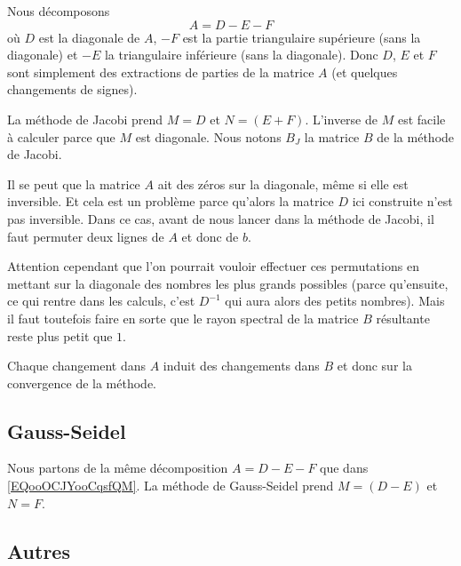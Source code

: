 Nous décomposons
\begin{equation}        \label{EQooOCJYooCqsfQM}
	A=D-E-F
\end{equation}
où \( D\) est la diagonale de \( A\), \( -F\) est la partie triangulaire supérieure (sans la diagonale) et \( -E\) la triangulaire inférieure (sans la diagonale). Donc \( D\), \( E\) et \( F\) sont simplement des extractions de parties de la matrice \( A\) (et quelques changements de signes).

La méthode de Jacobi prend \( M=D\) et \( N=(E+F)\). L'inverse de \( M\) est facile à calculer parce que \( M\) est diagonale. Nous notons \( B_J\) la matrice \( B\) de la méthode de Jacobi.

\begin{remark}
	Il se peut que la matrice \( A\) ait des zéros sur la diagonale, même si elle est inversible. Et cela est un problème parce qu'alors la matrice \( D\) ici construite n'est pas inversible. Dans ce cas, avant de nous lancer dans la méthode de Jacobi, il faut permuter deux lignes de \( A\) et donc de \( b\).

	Attention cependant que l'on pourrait vouloir effectuer ces permutations en mettant sur la diagonale des nombres les plus grands possibles (parce qu'ensuite, ce qui rentre dans les calculs, c'est \( D^{-1}\) qui aura alors des petits nombres). Mais il faut toutefois faire en sorte que le rayon spectral de la matrice \(B \) résultante reste plus petit que \( 1\).

	Chaque changement dans \( A\) induit des changements dans \( B\) et donc sur la convergence de la méthode.
\end{remark}

\subsection{Gauss-Seidel}

Nous partons de la même décomposition \( A=D-E-F\) que dans \eqref{EQooOCJYooCqsfQM}. La méthode de Gauss-Seidel prend \( M=(D-E)\) et \( N=F\).

\subsection{Autres}

